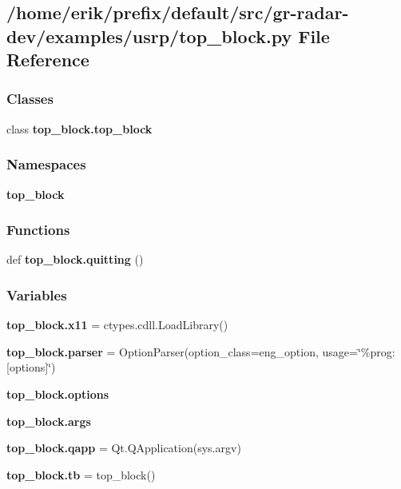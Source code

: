 \subsection{/home/erik/prefix/default/src/gr-\/radar-\/dev/examples/usrp/top\+\_\+block.py File Reference}
\label{top__block_8py}
\subsubsection*{Classes}
\begin{DoxyCompactItemize}
\item 
class {\bf top\+\_\+block.\+top\+\_\+block}
\end{DoxyCompactItemize}
\subsubsection*{Namespaces}
\begin{DoxyCompactItemize}
\item 
 {\bf top\+\_\+block}
\end{DoxyCompactItemize}
\subsubsection*{Functions}
\begin{DoxyCompactItemize}
\item 
def {\bf top\+\_\+block.\+quitting} ()
\end{DoxyCompactItemize}
\subsubsection*{Variables}
\begin{DoxyCompactItemize}
\item 
{\bf top\+\_\+block.\+x11} = ctypes.\+cdll.\+Load\+Library(\textquotesingle{})
\item 
{\bf top\+\_\+block.\+parser} = Option\+Parser(option\+\_\+class=eng\+\_\+option, usage=\char`\"{}\%prog\+: [options]\char`\"{})
\item 
{\bf top\+\_\+block.\+options}
\item 
{\bf top\+\_\+block.\+args}
\item 
{\bf top\+\_\+block.\+qapp} = Qt.\+Q\+Application(sys.\+argv)
\item 
{\bf top\+\_\+block.\+tb} = top\+\_\+block()
\end{DoxyCompactItemize}
